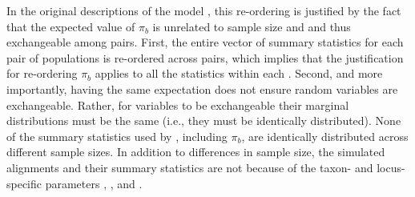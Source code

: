 In the original descriptions of the \msb model \cite{Hickerson2006,Huang2011},
this re-ordering is justified by the fact that the expected value of $\pi_b$ is
unrelated to sample size  and  and thus
exchangeable among pairs.
First, the entire vector of summary statistics \alignmentSS{}{} for each pair
of populations is re-ordered across pairs, which implies that the justification
for re-ordering $\pi_b$ applies to all the statistics within each
\alignmentSS{}{}.
Second, and more importantly, having the same expectation does not ensure
random variables are exchangeable.
Rather, for variables to be exchangeable their marginal distributions must be
the same (i.e., they must be identically distributed).
None of the summary statistics used by \msb, including $\pi_b$, are identically
distributed across different sample sizes.
In addition to differences in sample size, the simulated alignments and their
summary statistics are not  because of the taxon- and
locus-specific parameters \hkyModel{}{}, \mutationRateScalarConstant{}{}, and
\ploidyScalar{}{}.


